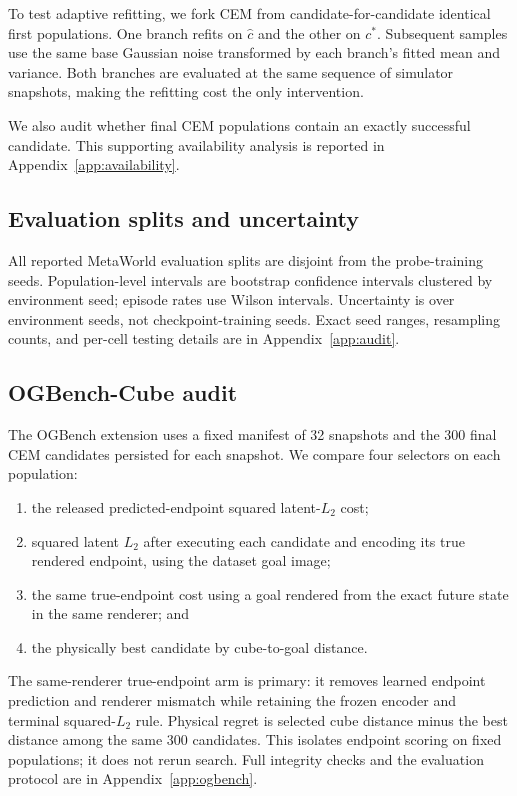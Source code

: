 \documentclass[10pt]{article}
\begin{document}
To test adaptive refitting, we fork CEM from candidate-for-candidate identical
first populations. One branch refits on $\hat c$ and the other on $c^*$.
Subsequent samples use the same base Gaussian noise transformed by each
branch's fitted mean and variance. Both branches are evaluated at the same
sequence of simulator snapshots, making the refitting cost the only
intervention.

We also audit whether final CEM populations contain an exactly successful
candidate. This supporting availability analysis is reported in
Appendix~\ref{app:availability}.

\subsection{Evaluation splits and uncertainty}

All reported MetaWorld evaluation splits are disjoint from the probe-training
seeds. Population-level intervals are bootstrap confidence intervals clustered
by environment seed; episode rates use Wilson intervals. Uncertainty is over
environment seeds, not checkpoint-training seeds. Exact seed ranges,
resampling counts, and per-cell testing details are in Appendix~\ref{app:audit}.

\subsection{OGBench-Cube audit}

The OGBench extension uses a fixed manifest of 32 snapshots and the 300 final
CEM candidates persisted for each snapshot. We compare four selectors on each
population:
\begin{enumerate}
  \item the released predicted-endpoint squared latent-$L_2$ cost;
  \item squared latent $L_2$ after executing each candidate and encoding its
  true rendered endpoint, using the dataset goal image;
  \item the same true-endpoint cost using a goal rendered from the exact future
  state in the same renderer; and
  \item the physically best candidate by cube-to-goal distance.
\end{enumerate}
The same-renderer true-endpoint arm is primary: it removes learned endpoint
prediction and renderer mismatch while retaining the frozen encoder and
terminal squared-$L_2$ rule. Physical regret is selected cube distance minus
the best distance among the same 300 candidates. This isolates endpoint
scoring on fixed populations; it does not rerun search. Full integrity checks
and the evaluation protocol are in Appendix~\ref{app:ogbench}.
\end{document}
